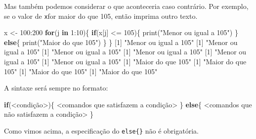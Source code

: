 \documentclass[
  10pt,
  a4paper]{book}
\newenvironment{Shaded}{\begin{snugshade}}{\end{snugshade}}
\newcommand{\ControlFlowTok}[1]{\textcolor[rgb]{0.13,0.29,0.53}{\textbf{#1}}}
\newcommand{\DecValTok}[1]{\textcolor[rgb]{0.00,0.00,0.81}{#1}}
\newcommand{\FunctionTok}[1]{\textcolor[rgb]{0.00,0.00,0.00}{#1}}
\newcommand{\NormalTok}[1]{#1}
\newcommand{\OtherTok}[1]{\textcolor[rgb]{0.56,0.35,0.01}{#1}}
\newcommand{\SpecialCharTok}[1]{\textcolor[rgb]{0.00,0.00,0.00}{#1}}
\newcommand{\StringTok}[1]{\textcolor[rgb]{0.31,0.60,0.02}{#1}}
\begin{document}
Mas também podemos considerar o que aconteceria caso contrário. Por
exemplo, se o valor de \texttt{x}for maior do que 105, então imprima outro
texto.

\begin{Shaded}
\begin{Highlighting}[]
\NormalTok{x }\OtherTok{\textless{}{-}} \DecValTok{100}\SpecialCharTok{:}\DecValTok{200}
\ControlFlowTok{for}\NormalTok{(j }\ControlFlowTok{in} \DecValTok{1}\SpecialCharTok{:}\DecValTok{10}\NormalTok{)\{}
    \ControlFlowTok{if}\NormalTok{(x[j] }\SpecialCharTok{\textless{}=} \DecValTok{105}\NormalTok{)\{}
        \FunctionTok{print}\NormalTok{(}\StringTok{"Menor ou igual a 105"}\NormalTok{)}
\NormalTok{    \} }\ControlFlowTok{else}\NormalTok{\{}
        \FunctionTok{print}\NormalTok{(}\StringTok{"Maior do que 105"}\NormalTok{)}
\NormalTok{    \}}
\NormalTok{\}}
\NormalTok{[}\DecValTok{1}\NormalTok{] }\StringTok{"Menor ou igual a 105"}
\NormalTok{[}\DecValTok{1}\NormalTok{] }\StringTok{"Menor ou igual a 105"}
\NormalTok{[}\DecValTok{1}\NormalTok{] }\StringTok{"Menor ou igual a 105"}
\NormalTok{[}\DecValTok{1}\NormalTok{] }\StringTok{"Menor ou igual a 105"}
\NormalTok{[}\DecValTok{1}\NormalTok{] }\StringTok{"Menor ou igual a 105"}
\NormalTok{[}\DecValTok{1}\NormalTok{] }\StringTok{"Menor ou igual a 105"}
\NormalTok{[}\DecValTok{1}\NormalTok{] }\StringTok{"Maior do que 105"}
\NormalTok{[}\DecValTok{1}\NormalTok{] }\StringTok{"Maior do que 105"}
\NormalTok{[}\DecValTok{1}\NormalTok{] }\StringTok{"Maior do que 105"}
\NormalTok{[}\DecValTok{1}\NormalTok{] }\StringTok{"Maior do que 105"}
\end{Highlighting}
\end{Shaded}

A sintaxe será sempre no formato:

\begin{Shaded}
\begin{Highlighting}[]
\ControlFlowTok{if}\NormalTok{(}\SpecialCharTok{\textless{}}\NormalTok{condição}\SpecialCharTok{\textgreater{}}\NormalTok{)\{}
    \SpecialCharTok{\textless{}}\NormalTok{comandos que satisfazem a condição}\SpecialCharTok{\textgreater{}}
\NormalTok{\} }\ControlFlowTok{else}\NormalTok{\{}
   \SpecialCharTok{\textless{}}\NormalTok{comandos que não satisfazem a condição}\SpecialCharTok{\textgreater{}}
\NormalTok{\}}
\end{Highlighting}
\end{Shaded}

Como vimos acima, a especificação do \texttt{else\{\}} não é obrigatória.
\end{document}
